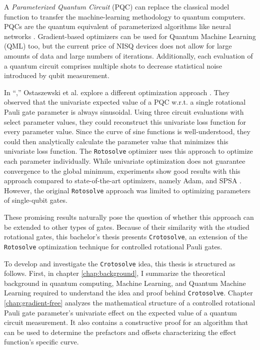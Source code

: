 A \emph{Parameterized Quantum Circuit} (PQC) can replace the classical model
function to transfer the machine-learning methodology to quantum computers.
PQCs are the quantum equivalent of parameterized algorithms like neural
networks \cite{benedetti_parameterized_2019}.
Gradient-based optimizers can be used for Quantum Machine Learning (QML) too,
but the current price of NISQ devices does not allow for large amounts of data
and large numbers of iterations.
Additionally, each evaluation of a quantum circuit comprises multiple shots to
decrease statistical noise introduced by qubit measurement.

In ``\emph{},'' Ostaszewski et al.
explore a different optimization approach \cite{ostaszewski_structure_2021}.
They observed that the univariate expected value of a PQC w.r.t. a single
rotational Pauli gate parameter is always sinusoidal.
Using three circuit evaluations with select parameter values, they could
reconstruct this univariate loss function for every parameter value.
Since the curve of sine functions is well-understood, they could then
analytically calculate the parameter value that minimizes this univariate loss
function.
The \texttt{Rotosolve} optimizer uses this approach to optimize each parameter
individually.
While univariate optimization does not guarantee convergence to the global
minimum, experiments show good results with this approach compared to
state-of-the-art optimizers, namely Adam, and SPSA
\cite{kingma_adam_2017,spall_multivariate_1992,ostaszewski_structure_2021}.
However, the original \texttt{Rotosolve} approach was limited to optimizing
parameters of single-qubit gates.

These promising results naturally pose the question of whether this approach can
be extended to other types of gates.
Because of their similarity with the studied rotational gates, this bachelor's
thesis presents \texttt{Crotosolve}, an extension of the \texttt{Rotosolve}
optimization technique for controlled rotational Pauli gates.

To develop and investigate the \texttt{Crotosolve} idea, this thesis is
structured as follows.
First, in chapter \ref{chap:background}, I summarize the theoretical background
in quantum computing, Machine Learning, and Quantum Machine Learning required to
understand the idea and proof behind \texttt{Crotosolve}.
Chapter \ref{chap:gradient-free} analyzes the mathematical structure of a
controlled rotational Pauli gate parameter's univariate effect on the
expected value of a quantum circuit measurement.
It also contains a constructive proof for an algorithm that can be used to
determine the prefactors and offsets characterizing the effect function's
specific curve.

